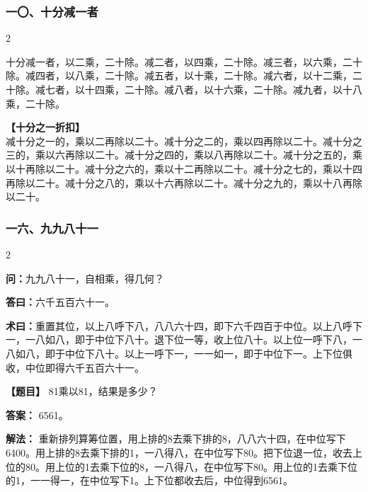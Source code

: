 \documentclass[11pt,a4paper]{article}
\begin{document}
\vspace{0.3cm}

\subsubsection*{一〇、十分减一者}
\begin{paracol}{2}
\begin{problemclassical}
十分减一者，以二乘，二十除。减二者，以四乘，二十除。减三者，以六乘，二十除。减四者，以八乘，二十除。减五者，以十乘，二十除。减六者，以十二乘，二十除。减七者，以十四乘，二十除。减八者，以十六乘，二十除。减九者，以十八乘，二十除。
\end{problemclassical}
\switchcolumn
\begin{problemmodern}
\textbf{【十分之一折扣】}\\
减十分之一的，乘以二再除以二十。减十分之二的，乘以四再除以二十。减十分之三的，乘以六再除以二十。减十分之四的，乘以八再除以二十。减十分之五的，乘以十再除以二十。减十分之六的，乘以十二再除以二十。减十分之七的，乘以十四再除以二十。减十分之八的，乘以十六再除以二十。减十分之九的，乘以十八再除以二十。
\end{problemmodern}
\end{paracol}

\vspace{0.3cm}

\subsubsection*{一六、九九八十一}
\begin{paracol}{2}
\begin{problemclassical}
\textbf{问：}九九八十一，自相乘，得几何？

\textbf{答曰：}六千五百六十一。

\textbf{术曰：}重置其位，以上八呼下八，八八六十四，即下六千四百于中位。以上八呼下一，一八如八，即于中位下八十。退下位一等，收上位八十。以上位一呼下八，一八如八，即于中位下八十。以上一呼下一，一一如一，即于中位下一。上下位俱收，中位即得六千五百六十一。
\end{problemclassical}
\switchcolumn
\begin{problemmodern}
\textbf{【题目】} 81乘以81，结果是多少？

\textbf{答案：} 6561。

\textbf{解法：} 重新排列算筹位置，用上排的8去乘下排的8，八八六十四，在中位写下6400。用上排的8去乘下排的1，一八得八，在中位写下80。把下位退一位，收去上位的80。用上位的1去乘下位的8，一八得八，在中位写下80。用上位的1去乘下位的1，一一得一，在中位写下1。上下位都收去后，中位得到6561。
\end{problemmodern}
\end{paracol}
\end{document}
